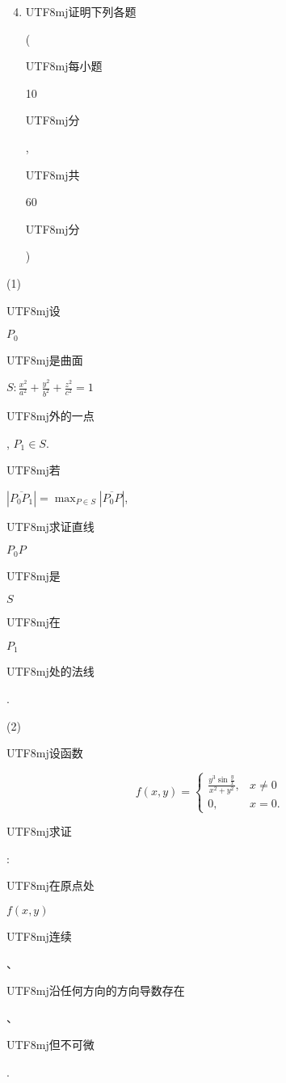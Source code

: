 \documentclass[10pt]{article}
\begin{document}
\begin{enumerate}
  \setcounter{enumi}{3}
  \item \begin{CJK}{UTF8}{mj}证明下列各题\end{CJK} (\begin{CJK}{UTF8}{mj}每小题\end{CJK} 10 \begin{CJK}{UTF8}{mj}分\end{CJK}, \begin{CJK}{UTF8}{mj}共\end{CJK} 60 \begin{CJK}{UTF8}{mj}分\end{CJK})
\end{enumerate}
(1) \begin{CJK}{UTF8}{mj}设\end{CJK} $P_{0}$ \begin{CJK}{UTF8}{mj}是曲面\end{CJK} $S: \frac{x^{2}}{a^{2}}+\frac{y^{2}}{b^{2}}+\frac{z^{2}}{c^{2}}=1$ \begin{CJK}{UTF8}{mj}外的一点\end{CJK}, $P_{1} \in S$. \begin{CJK}{UTF8}{mj}若\end{CJK} $\left|\overline{P_{0} P_{1}}\right|=\max _{P \in S}\left|\overline{P_{0} P}\right|$, \begin{CJK}{UTF8}{mj}求证直线\end{CJK} $P_{0} P$ \begin{CJK}{UTF8}{mj}是\end{CJK} $S$ \begin{CJK}{UTF8}{mj}在\end{CJK} $P_{1}$ \begin{CJK}{UTF8}{mj}处的法线\end{CJK}.

(2) \begin{CJK}{UTF8}{mj}设函数\end{CJK}
$$
f(x, y)= \begin{cases}\frac{y^{3} \sin \frac{y}{x}}{x^{2}+y^{2}}, & x \neq 0 \\ 0, & x=0 .\end{cases}
$$
\begin{CJK}{UTF8}{mj}求证\end{CJK}: \begin{CJK}{UTF8}{mj}在原点处\end{CJK} $f(x, y)$ \begin{CJK}{UTF8}{mj}连续\end{CJK}、\begin{CJK}{UTF8}{mj}沿任何方向的方向导数存在\end{CJK}、\begin{CJK}{UTF8}{mj}但不可微\end{CJK}.
\end{document}
